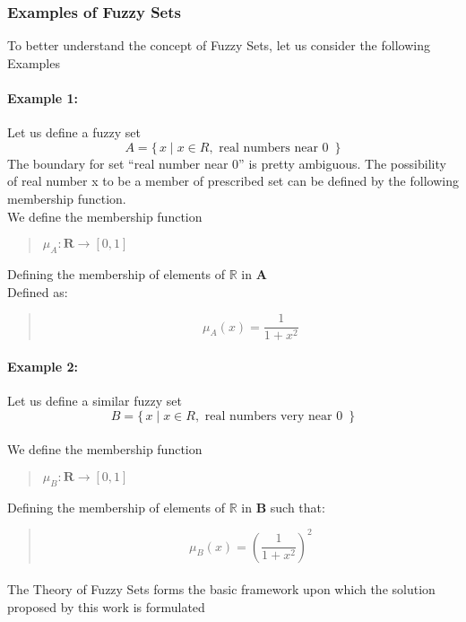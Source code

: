 \documentclass[a4paper,openany]{book}
\begin{document}
				\subsubsection{Examples of Fuzzy Sets}
					To better understand the concept of Fuzzy Sets, let us consider the following Examples
					\paragraph{Example 1:}
						Let us define a fuzzy set 
						\[
						A = \{\, x \mid x \in R, \text{ real numbers near 0 } \,\}
						\]
						The boundary for set “real number near 0” is pretty ambiguous. The possibility of real number x to be a member of prescribed set can be defined by the following membership function.\\
						We define the membership function
						\begin{verse}
							$ \mu_A \colon \textbf{R} \to [0,1] $
						\end{verse}
						Defining the membership of elements of $\mathbb{R}$ in $\mathbf{A}$\\
						Defined as:
						\begin{verse}
							\begin{equation}
								\mu_A(x) = \frac{1}{1+x^2}
							\end{equation}
						\end{verse}
					\paragraph{Example 2:}
						Let us define a similar fuzzy set 
						\[
						B = \{\, x \mid x \in R, \text{ real numbers very near 0 } \,\}
						\]
						\\We define the membership function
						\begin{verse}
							$\mu_B\colon \textbf{R} \to [0,1] $
						\end{verse}
						Defining the membership of elements of $\mathbb{R}$ in $\mathbf{B}$ such that:
						\begin{verse}
							\begin{equation}
								\mu_B(x) = \left( \frac{1}{1+x^2} \right)^{2}
							\end{equation}
						\end{verse}
					\paragraph{}
						The Theory of Fuzzy Sets forms the basic framework upon which the solution proposed by this work is formulated		
\end{document}
